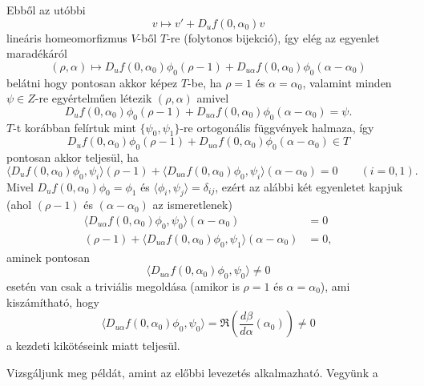 \documentclass[oneside, titlepage, 12pt, a4paper]{report}
\begin{document}
Ebből az utóbbi
\begin{equation*}
v \mapsto v' + D_uf(0, \alpha_0)v
\end{equation*}
lineáris homeomorfizmus $V$-ből $T$-re (folytonos bijekció), így elég az egyenlet maradékáról
\begin{equation*}
(\rho, \alpha) \mapsto D_uf(0, \alpha_0) \phi_0 (\rho - 1) + D_{u \alpha}f(0, \alpha_0) \phi_0 (\alpha - \alpha_0)
\end{equation*}
belátni hogy pontosan akkor képez $T$-be, ha $\rho = 1$ és $\alpha = \alpha_0$, valamint minden $\psi \in Z$-re egyértelműen létezik $(\rho, \alpha)$ amivel
\begin{equation*}
D_uf(0, \alpha_0) \phi_0 (\rho - 1) + D_{u \alpha}f(0, \alpha_0) \phi_0 (\alpha - \alpha_0) = \psi.
\end{equation*}
$T$-t korábban felírtuk mint $\{\psi_0, \psi_1\}$-re ortogonális függvények halmaza, így
\begin{equation*}
D_uf(0, \alpha_0) \phi_0 (\rho - 1) + D_{u \alpha}f(0, \alpha_0) \phi_0 (\alpha - \alpha_0) \in T
\end{equation*}
pontosan akkor teljesül, ha
\begin{equation*}
\langle D_uf(0, \alpha_0) \phi_0, \psi_i \rangle (\rho - 1) + \langle D_{u \alpha}f(0, \alpha_0) \phi_0, \psi_i \rangle (\alpha - \alpha_0) = 0 \qquad (i = 0, 1).
\end{equation*}
Mivel $D_uf(0, \alpha_0) \phi_0 = \phi_1$ és $\langle \phi_i, \psi_j \rangle = \delta_{ij}$, ezért az alábbi két egyenletet kapjuk (ahol $(\rho - 1)$ és $(\alpha - \alpha_0)$ az ismeretlenek)
\begin{align*}
\langle D_{u \alpha}f(0, \alpha_0) \phi_0, \psi_0 \rangle (\alpha - \alpha_0) &= 0 \\
(\rho - 1) + \langle D_{u \alpha}f(0, \alpha_0) \phi_0, \psi_1 \rangle (\alpha - \alpha_0) &= 0,
\end{align*}
aminek pontosan
\begin{equation*}
\langle D_{u \alpha}f(0, \alpha_0) \phi_0, \psi_0 \rangle \ne 0
\end{equation*}
esetén van csak a triviális megoldása (amikor is $\rho = 1$ és $\alpha = \alpha_0$), ami kiszámítható, hogy
\begin{equation*}
\langle D_{u \alpha}f(0, \alpha_0) \phi_0, \psi_0 \rangle = \Re (\frac{d\beta}{d\alpha}(\alpha_0)) \ne 0
\end{equation*}
a kezdeti kikötéseink miatt teljesül. \par
Vizsgáljunk meg példát, amint az előbbi levezetés alkalmazható. Vegyünk a
\end{document}
